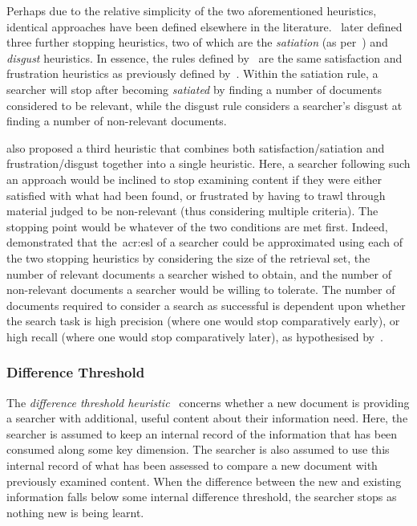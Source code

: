 Perhaps due to the relative simplicity of the two aforementioned heuristics, identical approaches have been defined elsewhere in the literature.~\cite{kraft1979stopping_rules} later defined three further stopping heuristics, two of which are the \emph{satiation} (as per~\cite{simon1955satiation}) and \emph{disgust} heuristics. In essence, the rules defined by~\cite{kraft1979stopping_rules} are the same satisfaction and frustration heuristics as previously defined by~\cite{cooper1973retrieval_effectiveness_ii}. Within the satiation rule, a searcher will stop after becoming \emph{satiated} by finding a number of documents considered to be relevant, while the disgust rule considers a searcher's disgust at finding a number of non-relevant documents.

\cite{kraft1979stopping_rules} also proposed a third heuristic that combines both satisfaction/satiation and frustration/disgust together into a single heuristic. Here, a searcher following such an approach would be inclined to stop examining content if they were either satisfied with what had been found, or frustrated by having to trawl through material judged to be non-relevant (thus considering multiple criteria). The stopping point would be whatever of the two conditions are met first. Indeed,~\cite{kraft1979stopping_rules} demonstrated that the~\gls{acr:esl} of a searcher could be approximated using each of the two stopping heuristics by considering the size of the retrieval set, the number of relevant documents a searcher wished to obtain, and the number of non-relevant documents a searcher would be willing to tolerate. The number of documents required to consider a search as successful is dependent upon whether the search task is high precision (where one would stop comparatively early), or high recall (where one would stop comparatively later), as hypothesised by~\cite{bates1984thirty_items}.

\subsubsection{Difference Threshold}\label{sec:stopping_background:heuristics:difference}
The \emph{difference threshold heuristic}~\citep{nickles1995judgment} concerns whether a new document is providing a searcher with additional, useful content about their information need. Here, the searcher is assumed to keep an internal record of the information that has been consumed along some key dimension. The searcher is also assumed to use this internal record of what has been assessed to compare a new document with previously examined content. When the difference between the new and existing information falls below some internal difference threshold, the searcher stops as nothing new is being learnt.

